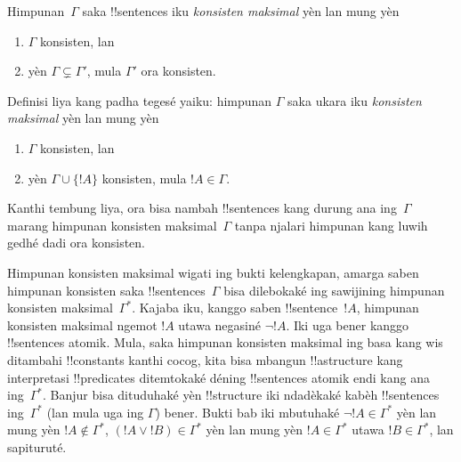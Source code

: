 \documentclass[../../../include/open-logic-section]{subfiles}
\begin{document}

\begin{defn}
Himpunan~$\Gamma$ saka !!{sentence}s iku
\emph{konsisten maksimal} yèn lan mung yèn
\begin{enumerate}
\item $\Gamma$ konsisten, lan
\item yèn $\Gamma \subsetneq \Gamma'$, mula $\Gamma'$ ora konsisten.
\end{enumerate}
\end{defn}

\begin{explain}
Definisi liya kang padha tegesé yaiku: himpunan $\Gamma$
saka ukara iku \emph{konsisten maksimal} yèn lan mung yèn
\begin{enumerate}
\item $\Gamma$ konsisten, lan
\item yèn $\Gamma \cup \{ !A \}$ konsisten, mula $!A \in \Gamma$.
\end{enumerate}
Kanthi tembung liya, ora bisa nambah !!{sentence}s kang
durung ana ing~$\Gamma$ marang himpunan konsisten maksimal~$\Gamma$
tanpa njalari himpunan kang luwih gedhé dadi ora konsisten.
\end{explain}

\begin{explain}
Himpunan konsisten maksimal wigati ing bukti kelengkapan,
amarga saben himpunan konsisten saka !!{sentence}s~$\Gamma$
bisa dilebokaké ing sawijining himpunan konsisten maksimal~$\Gamma^*$.
Kajaba iku, kanggo saben !!{sentence}~$!A$, himpunan konsisten
maksimal ngemot $!A$ utawa negasiné $\lnot !A$.
Iki uga bener kanggo !!{sentence}s atomik. Mula, saka himpunan
konsisten maksimal ing basa kang wis ditambahi !!{constant}s
kanthi cocog, kita bisa mbangun !!a{structure} kang interpretasi
!!{predicate}s ditemtokaké déning !!{sentence}s atomik endi
kang ana ing~$\Gamma^*$. Banjur bisa dituduhaké yèn !!{structure}
iki ndadèkaké kabèh !!{sentence}s ing~$\Gamma^*$
(lan mula uga ing $\Gamma$) bener. Bukti bab iki mbutuhaké
$\lnot !A \in \Gamma^*$ yèn lan mung yèn $!A \notin \Gamma^*$,
$(!A \lor !B) \in \Gamma^*$ yèn lan mung yèn $!A
\in \Gamma^*$ utawa $!B \in \Gamma^*$, lan sapituruté.
\end{explain}
\end{document}
